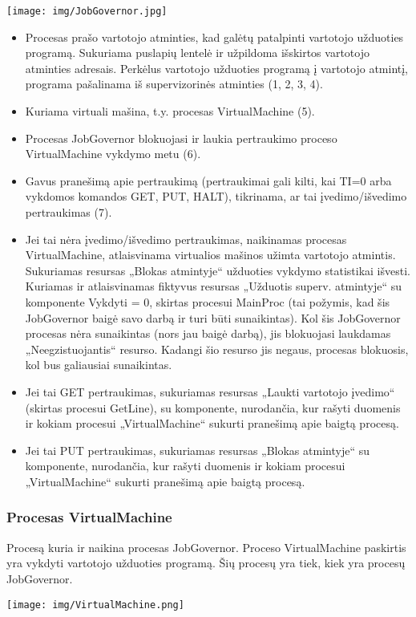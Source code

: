 \texttt{[image: img/JobGovernor.jpg]}

	\begin{itemize}
		\item Procesas prašo vartotojo atminties, kad galėtų patalpinti vartotojo užduoties programą. Sukuriama puslapių lentelė ir užpildoma išskirtos vartotojo atminties adresais. Perkėlus vartotojo užduoties programą į vartotojo atmintį, programa pašalinama iš supervizorinės atminties (1, 2, 3, 4). 
		\item Kuriama virtuali mašina, t.y. procesas VirtualMachine (5).
		\item Procesas JobGovernor blokuojasi ir laukia pertraukimo proceso VirtualMachine vykdymo metu (6).
		\item Gavus pranešimą apie pertraukimą (pertraukimai gali kilti, kai TI=0 arba vykdomos komandos GET, PUT, HALT), tikrinama, ar tai įvedimo/išvedimo pertraukimas (7).
		\item Jei tai nėra įvedimo/išvedimo pertraukimas, naikinamas procesas VirtualMachine, atlaisvinama virtualios mašinos užimta vartotojo atmintis. Sukuriamas resursas „Blokas atmintyje“ užduoties vykdymo statistikai išvesti. Kuriamas ir atlaisvinamas fiktyvus resursas „Užduotis superv. atmintyje“ su komponente Vykdyti = 0, skirtas procesui MainProc (tai požymis, kad šis JobGovernor baigė savo darbą ir turi būti sunaikintas). Kol šis JobGovernor procesas nėra sunaikintas (nors jau baigė darbą), jis blokuojasi laukdamas „Neegzistuojantis“ resurso. Kadangi šio resurso jis negaus, procesas blokuosis, kol bus galiausiai sunaikintas.
		\item Jei tai GET pertraukimas, sukuriamas resursas „Laukti vartotojo įvedimo“ (skirtas procesui GetLine), su komponente, nurodančia, kur rašyti duomenis ir kokiam procesui „VirtualMachine“ sukurti pranešimą apie baigtą procesą.
		\item Jei tai PUT pertraukimas, sukuriamas resursas „Blokas atmintyje“ su komponente, nurodančia, kur rašyti duomenis ir kokiam procesui „VirtualMachine“ sukurti pranešimą apie baigtą procesą.
	\end{itemize}
\subsubsection{Procesas VirtualMachine}
Procesą kuria ir naikina procesas JobGovernor. Proceso VirtualMachine paskirtis yra vykdyti vartotojo užduoties programą. Šių procesų yra tiek, kiek yra procesų JobGovernor.

\texttt{[image: img/VirtualMachine.png]}

